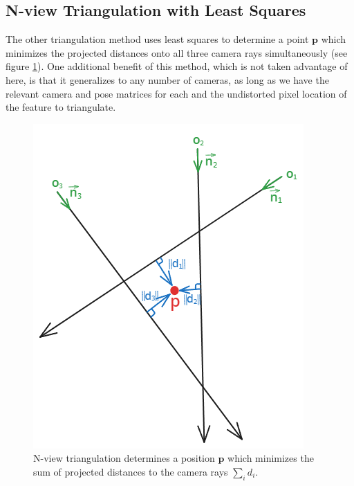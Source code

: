 \documentclass[11pt, letterpaper]{extarticle} %
\begin{document}
\subsection{N-view Triangulation with Least Squares} \label{subsec:n-view_triangulation_with_least_squares}
The other triangulation method uses least squares to determine a point $\mathbf{p}$ which minimizes the projected distances onto all three camera rays simultaneously (see figure \ref{fig:n-view_triangulate}). One additional benefit of this method, which is not taken advantage of here, is that it generalizes to any number of cameras, as long as we have the relevant camera and pose matrices for each and the undistorted pixel location of the feature to triangulate. 

\begin{figure}[h!]
    \centering
    \includegraphics[width=0.4\linewidth]{n-view_triangulate.png}
    \caption{N-view triangulation determines a position $\mathbf{p}$ which minimizes the sum of projected distances to the camera rays $\sum_i d_i$.}
    \label{fig:n-view_triangulate}
\end{figure}
\end{document}
